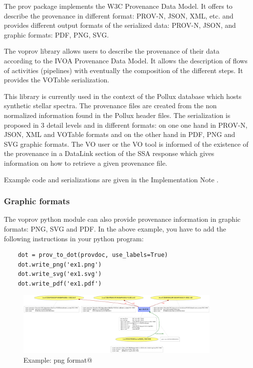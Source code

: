 The prov package implements the W3C Provenance Data Model.  It offers to
describe the provenance in different format: PROV-N, JSON, XML, etc. and
provides different output formats of the serialized data: PROV-N, JSON, and
graphic formats: PDF, PNG, SVG.

The voprov library allows users to describe the provenance of their data
according to the IVOA Provenance Data Model. It allows the description of flows
of activities (pipelines) with eventually the composition of the different
steps. It provides the VOTable serialization.

This library is currently used in the context of the Pollux database which hosts
synthetic stellar spectra. The provenance files are created from the non
normalized information found in the Pollux header files. The serialization is
proposed in 3 detail levels and in different formats: on one one hand in PROV-N,
JSON, XML and VOTable formats and on the other hand in PDF, PNG and SVG graphic
formats. The VO user or the VO tool is informed of the existence of the
provenance in a DataLink section of the SSA response which gives information on
how to retrieve a given provenance file.


Example code and serializations are given in the Implementation Note
\citep{std:ProvenanceImplementationNote}.


\subsubsection{Graphic formats}
\label{sec:graphic_formats}
The voprov python module can also provide provenance information in graphic formats: PNG, SVG and PDF.
In the above example, you have to add the following instructions in your python program:

\begin{verbatim}
    dot = prov_to_dot(provdoc, use_labels=True)
    dot.write_png('ex1.png')
    dot.write_svg('ex1.svg')
    dot.write_pdf('ex1.pdf')
\end{verbatim}

\begin{figure}
\centering
\includegraphics[width=0.9\textwidth]{access_ex1.png}
\caption{Example: png format@}
\label{fig:example}
\end{figure}



